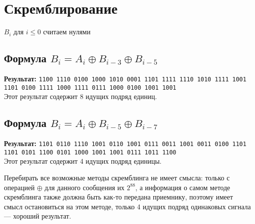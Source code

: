 \section{Скремблирование}
$B_i$ для $i\leq 0$ считаем нулями
\subsection{Формула $B_i=A_i\oplus B_{i-3}\oplus B_{i-5}$}
\textbf{Результат:} \texttt{1100 1110 0100 1000 1010 0001 1101 1111 1110 1010 1111 1001 1101 0100 1111 1000 1111 0111 1000 0100 1001 1001}\\
Этот результат содержит 8 идущих подряд единиц.
\subsection{Формула $B_i=A_i\oplus B_{i-5}\oplus B_{i-7}$}
\textbf{Результат:} \texttt{1101 0110 1110 1001 0110 1001 0111 0011 1001 0011 0100 1101 1101 0101 1100 0101 1000 1001 1001 0111 1011 1100}\\
Этот результат содержит 4 идущих подряд единицы.

Перебирать все возможные методы скремблинга не имеет смысла: только с операцией $\oplus$ для
данного сообщения их $2^{88}$, а информация о самом методе скремблинга также должна быть как-то передана приемнику,
поэтому имеет смысл остановиться на этом методе, только 4 идущих подряд одинаковых сигнала --- хороший результат.
